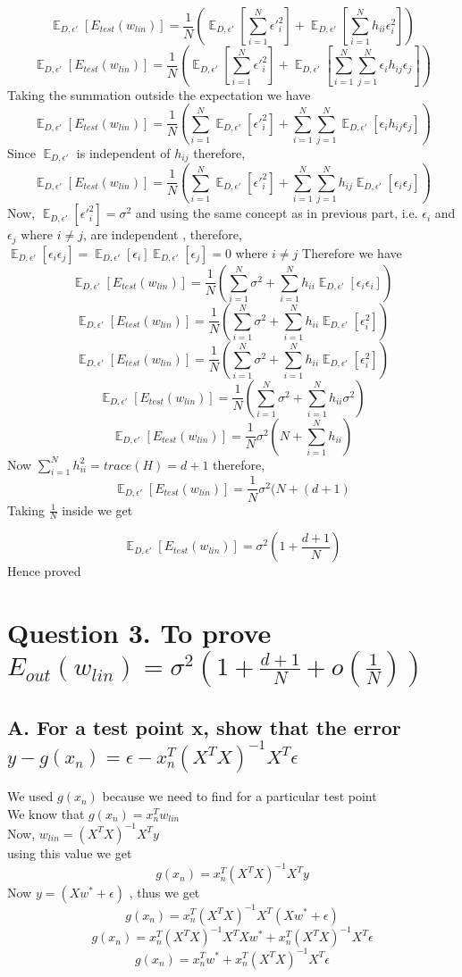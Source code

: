 \documentclass{article}
\DeclareMathOperator{\E}{\mathbb{E}}
\begin{document}
$$\E_{D,\epsilon'}[E_{test}(w_{lin})]=\frac{1}{N}(\E_{D,\epsilon'}[ \sum_{i=1}^{N}\epsilon'_{i}^2]+\E_{D,\epsilon'}[ \sum_{i=1}^{N}h_{ii}\epsilon_i^2 ])$$
$$\E_{D,\epsilon'}[E_{test}(w_{lin})]=\frac{1}{N}(\E_{D,\epsilon'}[ \sum_{i=1}^{N}\epsilon'_{i}^2]+\E_{D,\epsilon'}[ \sum_{i=1}^{N}\sum_{j=1}^{N}\epsilon_ih_{ij}\epsilon_j ])$$
Taking the summation outside the expectation we have 
$$\E_{D,\epsilon'}[E_{test}(w_{lin})]=\frac{1}{N}(\sum_{i=1}^{N}\E_{D,\epsilon'}[ \epsilon'_{i}^2]+\sum_{i=1}^{N}\sum_{j=1}^{N}\E_{D,\epsilon'}[ \epsilon_ih_{ij}\epsilon_j ])$$
Since $\E_{D,\epsilon'}$ is independent of $h_{ij}$ therefore, 
$$\E_{D,\epsilon'}[E_{test}(w_{lin})]=\frac{1}{N}(\sum_{i=1}^{N}\E_{D,\epsilon'}[ \epsilon'_{i}^2]+\sum_{i=1}^{N}\sum_{j=1}^{N}h_{ij}\E_{D,\epsilon'}[ \epsilon_i\epsilon_j ])$$
Now, $\E_{D,\epsilon'}[ \epsilon'_{i}^2]=\sigma^2$ and using the same concept as in previous part, i.e. $\epsilon_i $ and $\epsilon_j$ where $i\neq j $, are independent , therefore, $\E_{D,\epsilon'}[\epsilon_i\epsilon_j] = \E_{D,\epsilon'}[\epsilon_i]\E_{D,\epsilon'}[\epsilon_j] =0$ where $i\neq j $
Therefore we have 
$$\E_{D,\epsilon'}[E_{test}(w_{lin})]=\frac{1}{N}(\sum_{i=1}^{N}\sigma^2+\sum_{i=1}^{N}h_{ii}\E_{D,\epsilon'}[ \epsilon_i\epsilon_i ])$$
$$\E_{D,\epsilon'}[E_{test}(w_{lin})]=\frac{1}{N}(\sum_{i=1}^{N}\sigma^2+\sum_{i=1}^{N}h_{ii}\E_{D,\epsilon'}[ \epsilon_i^2])$$
$$\E_{D,\epsilon'}[E_{test}(w_{lin})]=\frac{1}{N}(\sum_{i=1}^{N}\sigma^2+\sum_{i=1}^{N}h_{ii}\E_{D,\epsilon'}[ \epsilon_i^2])$$
$$\E_{D,\epsilon'}[E_{test}(w_{lin})]=\frac{1}{N}(\sum_{i=1}^{N}\sigma^2+\sum_{i=1}^{N}h_{ii}\sigma^2)$$
$$\E_{D,\epsilon'}[E_{test}(w_{lin})]=\frac{1}{N}\sigma^2(N+\sum_{i=1}^{N}h_{ii})$$
Now $\sum_{i=1}^{N}h_{ii}^2 = trace(H)  = d+1$ therefore,
$$\E_{D,\epsilon'}[E_{test}(w_{lin})]=\frac{1}{N}\sigma^2(N+(d+1)$$
Taking $\frac{1}{N}$ inside we get

$$\E_{D,\epsilon'}[E_{test}(w_{lin})]=\sigma^2(1+\frac{d+1}{N})$$
Hence proved

\section{Question 3.  To prove $E_{out}(w_{lin})=\sigma^2(1+\frac{d+1}{N}+o(\frac{1}{N}))$}
\subsection{A. For a test point x, show that the error $y - g(x_n) = \epsilon - x_n^T(X^TX)^{-1}X^T\epsilon$ }
We used $g(x_n)$ because we need to find for a particular test point \\
We know that $g(x_n)=x_n^Tw_{lin}$\\
Now, $w_{lin}=(X^TX)^{-1}X^Ty$\\
using this value we get
$$g(x_n)=x_n^T(X^TX)^{-1}X^Ty$$
Now $y=(Xw^*+\epsilon)$ , thus we get 
$$g(x_n)=x_n^T(X^TX)^{-1}X^T(Xw^*+\epsilon)$$
$$g(x_n)=x_n^T(X^TX)^{-1}X^TXw^*+x_n^T(X^TX)^{-1}X^T\epsilon$$
$$g(x_n)=x_n^Tw^*+x_n^T(X^TX)^{-1}X^T\epsilon$$
\end{document}
